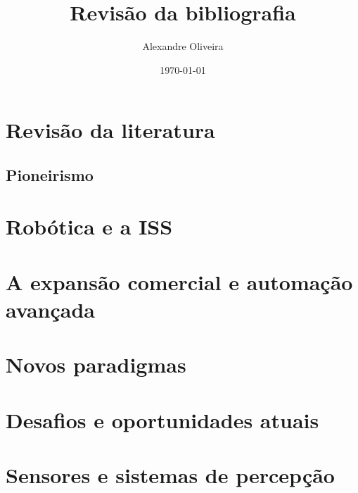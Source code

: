 \documentclass[a4paper,12pt]{article}
\begin{document}
\title{Revisão da bibliografia}
\author{Alexandre Oliveira}
\date{\today}
\maketitle

\section{Revisão da literatura}

\subsection{Pioneirismo}



% 

\section{Robótica e a ISS}



\section{A expansão comercial e automação avançada}



\section{Novos paradigmas}



\section{Desafios e oportunidades atuais}



\section{Sensores e sistemas de percepção}
\end{document}
